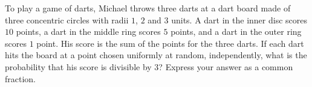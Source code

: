 To play a game of darts, Michael throws three darts at a dart board made of three concentric circles with radii $1$, $2$ and $3$ units. A dart in the inner disc scores $10$ points, a dart in the middle ring scores $5$ points, and a dart in the outer ring scores $1$ point. His score is the sum of the points for the three darts. If each dart hits the board at a point chosen uniformly at random, independently, what is the probability that his score is divisible by $3$? Express your answer as a common fraction.

